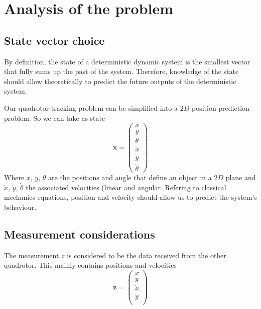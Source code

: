 \documentclass[12pt]{article}
\begin{document}
\section{Analysis of the problem}

\subsection{State vector choice}
By definition, the state of a deterministic dynamic system is the smallest vector that fully sums up the past of the system.
Therefore, knowledge of the state should allow theoretically to predict the future outputs of the deterministic system.

Our quadrotor tracking problem can be simplified into a $2D$ position prediction problem.
So we can take as state
\begin{equation}
\mathbf{x} =
    \begin{pmatrix}
        x\\
        y\\
        \theta\\
        \dot{x}\\
        \dot{y}\\
        \dot{\theta}
    \end{pmatrix}
\end{equation}
Where $x$, $y$, $\theta$ are the positions and angle that define an object in a $2D$ plane and $\dot{x}$, $\dot{y}$, $\dot{\theta}$ the associated velocities (linear and angular.
Refering to classical mechanics equations, position and velocity should allow us to predict the system's behaviour.

\subsection{Measurement considerations}
The measurement $z$ is considered to be the data received from the other quadrotor. This mainly contains positions and velocities
\begin{equation}
\mathbf{z} =
    \begin{pmatrix}
        x\\
        y\\
        \dot{x}\\
        \dot{y}\\
    \end{pmatrix}
\end{equation}
\end{document}
